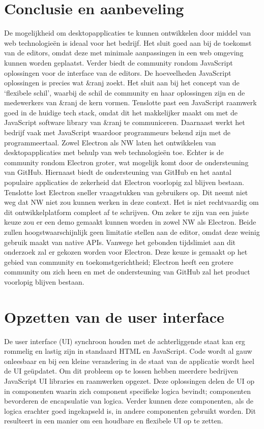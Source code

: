 \section{Conclusie en aanbeveling}
De mogelijkheid om desktopapplicaties te kunnen ontwikkelen door middel van web technologieën is ideaal voor het bedrijf. Het sluit goed aan bij de toekomst van de editors, omdat deze met minimale aanpassingen in een web omgeving kunnen worden geplaatst. Verder biedt de community rondom JavaScript oplossingen voor de interface van de editors. De hoeveelheden JavaScript oplossingen is precies wat \&ranj zoekt. Het sluit aan bij het concept van de ‘flexibele schil’, waarbij de schil de community en haar oplossingen zijn en de medewerkers van \&ranj de kern vormen. Tenslotte past een JavaScript raamwerk goed in de huidige tech stack, omdat dit het makkelijker maakt om met de JavaScript software library van \&ranj te communiceren. Daarnaast werkt het bedrijf vaak met JavaScript waardoor programmeurs bekend zijn met de programmeertaal.
Zowel Electron als NW laten het ontwikkelen van desktopapplicaties met behulp van web technologieën toe. Echter is de community rondom Electron groter, wat mogelijk komt door de ondersteuning van GitHub. Hiernaast biedt de ondersteuning van GitHub en het aantal populaire applicaties de zekerheid dat Electron voorlopig zal blijven bestaan. Tenslotte lost Electron sneller vraagstukken van gebruikers op.
Dit neemt niet weg dat NW niet zou kunnen werken in deze context. Het is niet rechtvaardig om dit ontwikkelplatform compleet af te schrijven. Om zeker te zijn van een juiste keuze zou er een demo gemaakt kunnen worden in zowel NW als Electron. Beide zullen hoogstwaarschijnlijk geen limitatie stellen aan de editor, omdat deze weinig gebruik maakt van native APIs. Vanwege het gebonden tijdslimiet aan dit onderzoek zal er gekozen worden voor Electron. Deze keuze is gemaakt op het gebied van community en toekomstgerichtheid; Electron heeft een grotere community om zich heen en met de ondersteuning van GitHub zal het product voorlopig blijven bestaan.

\section{Opzetten van de user interface}
De user interface (UI) synchroon houden met de achterliggende staat kan erg rommelig en lastig zijn in standaard HTML en JavaScript. Code wordt al gauw onleesbaar en bij een kleine verandering in de staat van de applicatie wordt heel de UI geüpdatet. Om dit probleem op te lossen hebben meerdere bedrijven JavaScript UI libraries en raamwerken opgezet. Deze oplossingen delen de UI op in componenten waarin zich component specifieke logica bevindt; componenten bevorderen de encapsulatie van logica. Verder kunnen deze componenten, als de logica erachter goed ingekapseld is, in andere componenten gebruikt worden. Dit resulteert in een manier om een houdbare en flexibele UI op te zetten.

